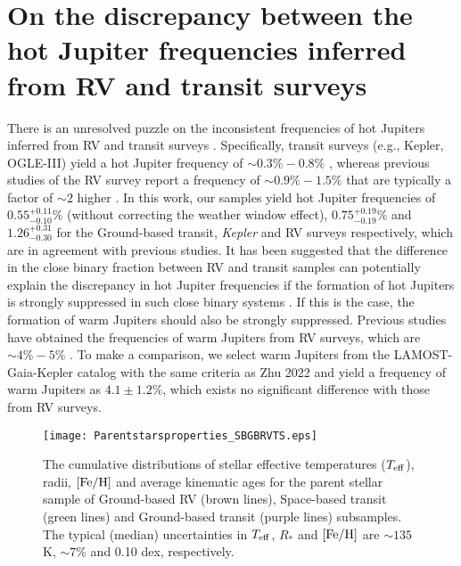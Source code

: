 \documentclass[twocolumn]{pnas-new}
\begin{document}
\section{On the discrepancy between the hot Jupiter frequencies inferred from RV and transit surveys}
\label{sec.discrepancy.RVTS}
There is an unresolved puzzle on the inconsistent frequencies of hot Jupiters inferred from RV and transit surveys \citep[e.g.,][]{2021ARA&A..59..291Z}.
Specifically, transit surveys (e.g., Kepler, OGLE-III) yield a hot Jupiter frequency of $\sim 0.3\%-0.8\%$ \citep[e.g.,][]{2006AcA....56....1G,2012ApJS..201...15H,2016A&A...587A..64S}, whereas previous studies of the RV survey report a frequency of $\sim 0.9\%-1.5\%$ that are typically a factor of $\sim 2$ higher \citep[e.g.,][]{2008PASP..120..531C,2011arXiv1109.2497M,2012ApJ...753..160W}.  
In this work, our samples yield hot Jupiter frequencies of $ 0.55^{+0.11}_{-0.10}\%$ (without correcting the weather window effect), $0.75^{+0.19}_{-0.19}\%$ and $1.26^{+0.31}_{-0.30}$ for the Ground-based transit, {\it Kepler} and RV surveys respectively, which are in agreement with previous studies.
It has been suggested that the difference in the close binary fraction between RV and transit samples can potentially explain the discrepancy in hot Jupiter frequencies if the formation of hot Jupiters is strongly suppressed in such close binary systems \citep{2021MNRAS.507.3593M,2022MNRAS.516...75B}.
If this is the case, the formation of warm Jupiters should also be strongly suppressed.
Previous studies have obtained the frequencies of warm Jupiters from RV surveys, which are $\sim 4\%-5\%$ \citep{2019ApJ...874...81F,2022AJ....164....5Z}.
To make a comparison, we select warm Jupiters from the LAMOST-Gaia-Kepler catalog with the same criteria as Zhu 2022 \citep[i.e., $0.1-1$ AU, $8-20 R_\oplus$;][]{2022AJ....164....5Z} and yield a frequency of warm Jupiters as $4.1 \pm 1.2\%$, which exists no significant difference with those from RV surveys. 

\begin{figure}[!t]
\centering
\texttt{[image: Parentstarsproperties\_SBGBRVTS.eps]}
\caption{The cumulative distributions of stellar effective temperatures ($T_{\rm eff}$), radii, $\rm [Fe/H]$ and average kinematic ages for the parent stellar sample of Ground-based RV (brown lines), Space-based transit (green lines) and Ground-based transit (purple lines) subsamples.
{The typical (median) uncertainties in $T_{\rm eff}$, $R_*$ and $\rm [Fe/H]$ are $\sim 135$ K, $\sim 7\%$ and 0.10 dex, respectively.}
\label{figParentstarspropertiesSPGBTS}}
\end{figure}
\end{document}
